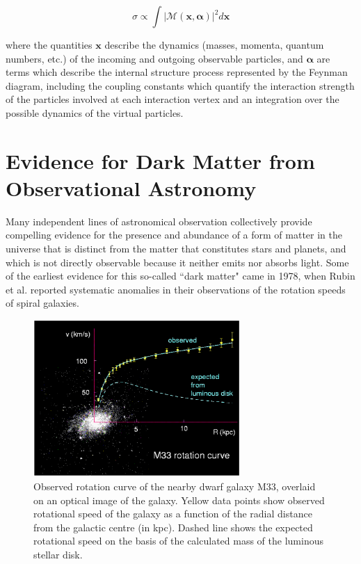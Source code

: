 \begin{equation}
\label{eq:matrix_element}
\sigma \propto \int|\mathcal{M(\boldsymbol{x}, \boldsymbol{\alpha})}|^2 d\boldsymbol{x} 
\end{equation}

\noindent where the quantities \(\boldsymbol{x}\) describe the dynamics (masses, momenta, quantum numbers, etc.) of the incoming and outgoing observable particles, and \(\boldsymbol{\alpha}\) are terms which describe the internal structure process represented by the Feynman diagram, including the coupling constants which quantify the interaction strength of the particles involved at each interaction vertex and an integration over the possible dynamics of the virtual particles. 


\section{Evidence for Dark Matter from Observational Astronomy}

Many independent lines of astronomical observation collectively provide compelling evidence for the presence and abundance of a form of matter in the universe that is distinct from the matter that constitutes stars and planets, and which is not directly observable because it neither emits nor absorbs light. Some of the earliest evidence for this so-called ``dark matter" came in 1978, when Rubin et al. \cite{Rubin_et_al} reported systematic anomalies in their observations of the rotation speeds of spiral galaxies. 



\begin{figure}[H]
	\centering
	\includegraphics[width=0.7\textwidth]{Figures/1/m33_rotation.pdf}
	\caption[]{Observed rotation curve of the nearby dwarf galaxy M33, overlaid on an optical image of the galaxy. Yellow data points show observed rotational speed of the galaxy as a function of the radial distance from the galactic centre (in kpc). Dashed line shows the expected rotational speed on the basis of the calculated mass of the luminous stellar disk. }
	\label{fig:standard_model}
\end{figure}

